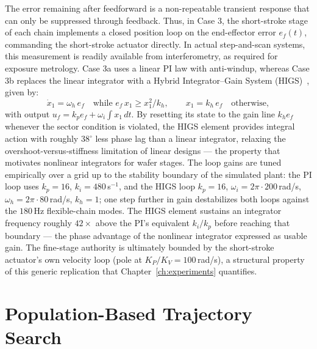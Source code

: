 The error remaining after feedforward is a non-repeatable transient response that can only be suppressed through feedback. Thus, in Case 3, the short-stroke stage of each chain implements a closed position loop on the end-effector error $e_f(t)$, commanding the short-stroke actuator directly. In actual step-and-scan systems, this measurement is readily available from interferometry, as required for exposure metrology. Case 3a uses a linear PI law with anti-windup, whereas Case 3b replaces the linear integrator with a Hybrid Integrator--Gain System (HIGS)~\cite{Heertjes2025_NonlinearControl}, given by:
\begin{equation}
    \dot{x}_1 = \omega_h\, e_f \quad \text{while } e_f\, x_1 \geq x_1^2 / k_h,
    \qquad x_1 = k_h\, e_f \quad \text{otherwise},
    \label{eq:higs}
\end{equation}
with output $u_f = k_p e_f + \omega_i \int x_1\, dt$. By resetting its state to the gain line $k_h e_f$ whenever the sector condition is violated, the HIGS element provides integral action with roughly $38^\circ$ less phase lag than a linear integrator, relaxing the overshoot-versus-stiffness limitation of linear designs --- the property that motivates nonlinear integrators for wafer stages. The loop gains are tuned empirically over a grid up to the stability boundary of the simulated plant: the PI loop uses $k_p = 16$, $k_i = 480$\,s$^{-1}$, and the HIGS loop $k_p = 16$, $\omega_i = 2\pi \cdot 200$\,rad/s, $\omega_h = 2\pi \cdot 80$\,rad/s, $k_h = 1$; one step further in gain destabilizes both loops against the $180$\,Hz flexible-chain modes. The HIGS element sustains an integrator frequency roughly $42\times$ above the PI's equivalent $k_i/k_p$ before reaching that boundary --- the phase advantage of the nonlinear integrator expressed as usable gain. The fine-stage authority is ultimately bounded by the short-stroke actuator's own velocity loop (pole at $K_P/K_V = 100$\,rad/s), a structural property of this generic replication that Chapter~\ref{ch:experiments} quantifies.

\section{Population-Based Trajectory Search}\label{sec:methodology_pso}

